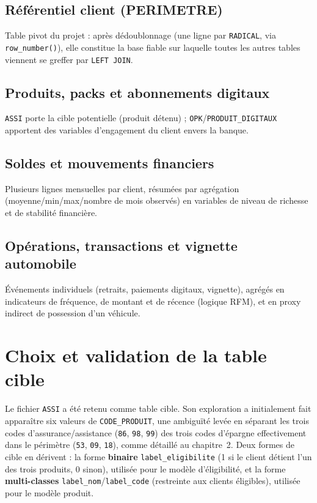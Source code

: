 \documentclass[11pt,a4paper]{report}
\begin{document}
\subsection{Référentiel client (PERIMETRE)}
Table pivot du projet : après dédoublonnage (une ligne par
\texttt{RADICAL}, via \texttt{row\_number()}), elle constitue la base
fiable sur laquelle toutes les autres tables viennent se greffer par
\texttt{LEFT JOIN}.

\subsection{Produits, packs et abonnements digitaux}
\texttt{ASSI} porte la cible potentielle (produit détenu) ;
\texttt{OPK}/\texttt{PRODUIT\_DIGITAUX} apportent des variables
d'engagement du client envers la banque.

\subsection{Soldes et mouvements financiers}
Plusieurs lignes mensuelles par client, résumées par agrégation
(moyenne/min/max/nombre de mois observés) en variables de niveau de
richesse et de stabilité financière.

\subsection{Opérations, transactions et vignette automobile}
Événements individuels (retraits, paiements digitaux, vignette),
agrégés en indicateurs de fréquence, de montant et de récence (logique
RFM), et en proxy indirect de possession d'un véhicule.

\section{Choix et validation de la table cible}
Le fichier \texttt{ASSI} a été retenu comme table cible. Son exploration a
initialement fait apparaître six valeurs de \texttt{CODE\_PRODUIT}, une
ambiguïté levée en séparant les trois codes d'assurance/assistance
(\texttt{86}, \texttt{98}, \texttt{99}) des trois codes d'épargne
effectivement dans le périmètre (\texttt{53}, \texttt{09}, \texttt{18}),
comme détaillé au chapitre~2. Deux formes de cible en dérivent : la forme
\textbf{binaire} \texttt{label\_eligibilite} (1 si le client détient l'un
des trois produits, 0 sinon), utilisée pour le modèle d'éligibilité, et la
forme \textbf{multi-classes} \texttt{label\_nom}/\texttt{label\_code}
(restreinte aux clients éligibles), utilisée pour le modèle produit.
\end{document}

